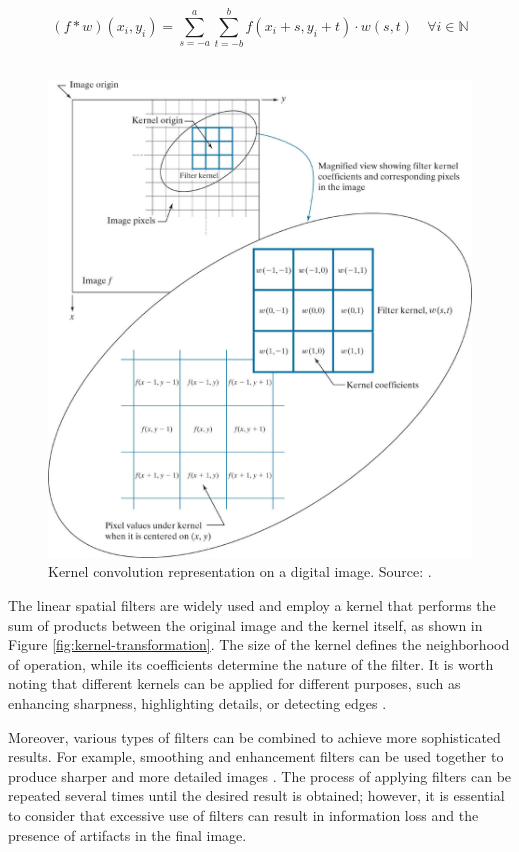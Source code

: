 \begin{equation}
(f * w)(x_i, y_i) = \sum_{s=-a}^{a} \sum_{t=-b}^{b} f(x_i +s, y_i +t) \cdot w(s, t) \quad \forall i \in \mathbb{N}
\label{eq:convolution-discreet}
\end{equation}\\


\begin{figure}[ht!]
\centering
\includegraphics[width=.65\linewidth]{images/Development/chap3/kernel.png}
\caption{Kernel convolution representation on a digital image. Source: \cite{gonzalez_rafael_c_digital_2018}.}
\label{fig:kernel-convolution}
\end{figure}



The linear spatial filters are widely used and employ a kernel that performs the sum of products between the original image and the kernel itself, as shown in Figure \ref{fig:kernel-transformation}. The size of the kernel defines the neighborhood of operation, while its coefficients determine the nature of the filter. It is worth noting that different kernels can be applied for different purposes, such as enhancing sharpness, highlighting details, or detecting edges \cite{gonzalez_rafael_c_digital_2018}.



Moreover, various types of filters can be combined to achieve more sophisticated results. For example, smoothing and enhancement filters can be used together to produce sharper and more detailed images \cite{mcandrew2004introduction}. The process of applying filters can be repeated several times until the desired result is obtained; however, it is essential to consider that excessive use of filters can result in information loss and the presence of artifacts in the final image.

